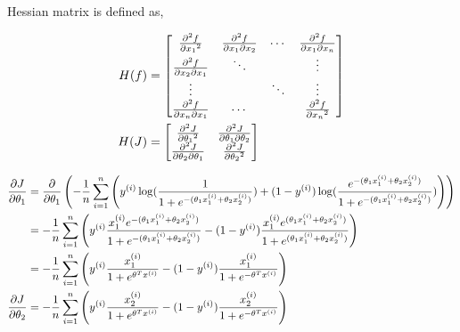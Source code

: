 \begin{answer}
Hessian matrix is defined as,

$$
\begin{aligned}
H(f) &= 
\begin{bmatrix} 
    {\partial^2 f \over {\partial x_1}^2} & {\partial^2 f \over {\partial x_1\partial x_2}} & \cdots & {\partial^2 f \over {\partial x_1\partial x_n}}\\
    {\partial^2 f \over {\partial x_2 \partial x_1}} & \ddots & & \vdots \\
    \vdots & & \ddots & \vdots\\
    {\partial^2 f \over {\partial x_n \partial x_1}} & \cdots & & {\partial^2 f \over {\partial x_n}^2}
\end{bmatrix} \\
H(J) &=
\begin{bmatrix} 
    {\partial^2 J \over {\partial \theta_1}^2} &  {\partial^2 J \over {\partial \theta_1\partial \theta_2}}\\
    {\partial^2 J \over {\partial \theta_2 \partial \theta_1}} & {\partial^2 J \over {\partial \theta_2}^2} \\
\end{bmatrix}
\end{aligned}
$$

$$
\begin{aligned}
{\partial J \over {\partial \theta_1}} 
&= {\partial \over {\partial \theta_1}} \left( 
- {1 \over n} \sum_{i=1}^n \left( y^{(i)}\log({1 \over {1 + e^{-(\theta_1 x_1^{(i)} + \theta_2 x_2^{(i)})}}}) 
+ (1-y^{(i)}) \log({e^{-(\theta_1 x_1^{(i)} + \theta_2 x_2^{(i)})} \over {1 + e^{-(\theta_1 x_1^{(i)} + \theta_2 x_2^{(i)})}}})\right) \right) \\
&=  - {1 \over n} \sum_{i=1}^n \left( 
y^{(i)} {x_1^{(i)} e^{-(\theta_1 x_1^{(i)} + \theta_2 x_2^{(i)})} \over {1 + e^{-(\theta_1 x_1^{(i)} + \theta_2 x_2^{(i)})}}} 
- (1-y^{(i)}) {x_1^{(i)} e^{(\theta_1 x_1^{(i)} + \theta_2 x_2^{(i)})} \over {1 + e^{(\theta_1 x_1^{(i)} + \theta_2 x_2^{(i)})}}}
\right) \\
&=  - {1 \over n} \sum_{i=1}^n \left( 
y^{(i)} {x_1^{(i)} \over {1 + e^{\theta^T x^{(i)}}}} 
- (1-y^{(i)}) {x_1^{(i)} \over {1 + e^{-\theta^T x^{(i)}}}}
\right) \\
{\partial J \over {\partial \theta_2}} 
&= - {1 \over n} \sum_{i=1}^n \left( 
y^{(i)} {x_2^{(i)} \over {1 + e^{\theta^T x^{(i)}}}} 
- (1-y^{(i)}) {x_2^{(i)} \over {1 + e^{-\theta^T x^{(i)}}}}
\right) \\
\end{aligned}
$$


\end{answer}
